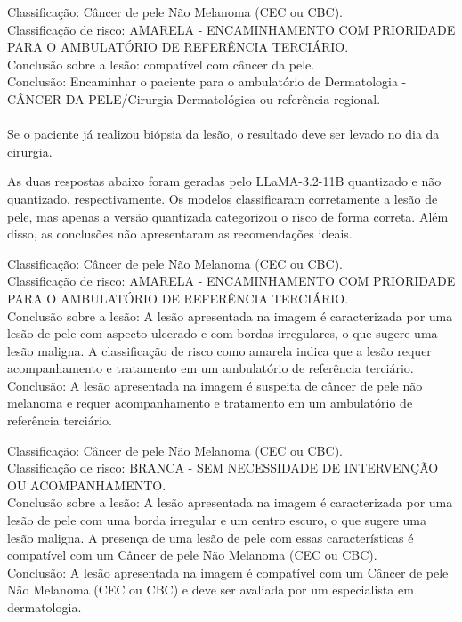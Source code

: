 \begin{dialogue}
     Classificação: Câncer de pele Não Melanoma (CEC ou CBC). \\
    Classificação de risco: AMARELA - ENCAMINHAMENTO COM PRIORIDADE PARA O AMBULATÓRIO DE REFERÊNCIA TERCIÁRIO. \\
    Conclusão sobre a lesão: compatível com câncer da pele. \\
    Conclusão: Encaminhar o paciente para o ambulatório de Dermatologia - CÂNCER DA PELE/Cirurgia Dermatológica ou
    referência regional. \\ \\
    Se o paciente já realizou biópsia da lesão, o resultado deve ser levado no dia da cirurgia.
\end{dialogue}

As duas respostas abaixo foram geradas pelo \ac{LLaMA}-3.2-11B quantizado e não quantizado, respectivamente. Os modelos
classificaram corretamente a lesão de pele, mas apenas a versão quantizada categorizou o risco de forma correta. Além
disso, as conclusões não apresentaram as recomendações ideais.

\begin{dialogue}
     Classificação: Câncer de pele Não Melanoma (CEC ou CBC). \\
    Classificação de risco: AMARELA - ENCAMINHAMENTO COM PRIORIDADE PARA O AMBULATÓRIO DE REFERÊNCIA TERCIÁRIO. \\
    Conclusão sobre a lesão: A lesão apresentada na imagem é caracterizada por uma lesão de pele com aspecto ulcerado e
    com bordas irregulares, o que sugere uma lesão maligna. A classificação de risco como amarela indica que a lesão
    requer
    acompanhamento e tratamento em um ambulatório de referência terciário. \\
    Conclusão: A lesão apresentada na imagem é suspeita de câncer de pele não melanoma e requer acompanhamento e
    tratamento em um ambulatório de referência terciário.
\end{dialogue}

\begin{dialogue}
     Classificação: Câncer de pele Não Melanoma (CEC ou CBC). \\
    Classificação de risco: BRANCA - SEM NECESSIDADE DE INTERVENÇÃO OU ACOMPANHAMENTO. \\
    Conclusão sobre a lesão: A lesão apresentada na imagem é caracterizada por uma lesão de pele com uma borda
    irregular e um centro escuro, o que sugere uma lesão maligna. A presença de uma lesão de pele com essas
    características
    é compatível com um Câncer de pele Não Melanoma (CEC ou CBC). \\
    Conclusão: A lesão apresentada na imagem é compatível com um Câncer de pele Não Melanoma (CEC ou CBC) e deve ser
    avaliada por um especialista em dermatologia.
\end{dialogue}

